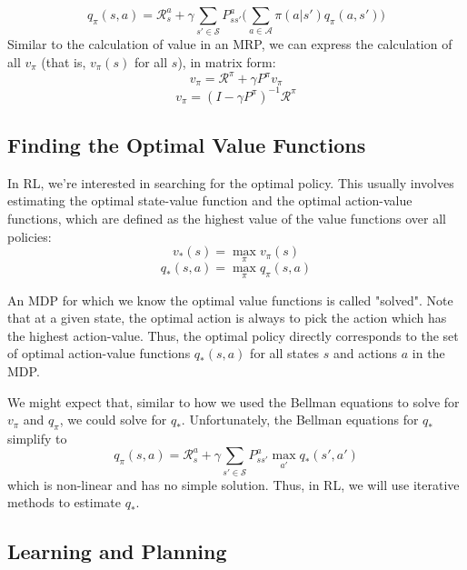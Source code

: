 \documentclass{article}
\begin{document}
\begin{equation}\label{eq:recursive_action_value_equation}
q_\pi(s, a) =  \mathcal{R}^a_s + \gamma\sum_{s'\in\mathcal{S}}P^a_{ss'}\bigg(\sum_{a\in\mathcal{A}} \pi(a|s')q_\pi(a, s')\bigg)
\end{equation}
Similar to the calculation of value in an MRP, we can express the calculation of all $v_\pi$ (that is, $v_\pi(s)$ for all $s$), in matrix form:
$$v_\pi = \mathcal{R}^\pi + \gamma P^\pi v_\pi$$
\begin{equation}\label{eq:bellman_simple_policy_value_equation}
v_\pi = (I - \gamma P^\pi)^{-1}\mathcal{R}^\pi
\end{equation}
\subsection{Finding the Optimal Value Functions}

In RL, we're interested in searching for the optimal policy. This usually involves estimating the optimal state-value function and the optimal action-value functions, which are defined as the highest value of the value functions over all policies:
\begin{equation}\label{eq:optimal_state_value_definition}
v_*(s) = \max_\pi v_\pi(s)
\end{equation}
\begin{equation}\label{eq:optimal_action_value_definition}
q_*(s, a) = \max_\pi q_\pi(s, a)
\end{equation}

An MDP for which we know the optimal value functions is called "solved". Note that at a given state, the optimal action is always to pick the action which has the highest action-value. Thus, the optimal policy directly corresponds to the set of optimal action-value functions $q_*(s, a)$ for all states $s$ and actions $a$ in the MDP.

We might expect that, similar to how we used the Bellman equations to solve for $v_\pi$ and $q_\pi$, we could solve for $q_*$. Unfortunately, the Bellman equations for $q_*$ simplify to
\begin{equation}\label{eq:bellman_optimal_action_value}
q_\pi(s, a) =  \mathcal{R}^a_s + \gamma\sum_{s'\in\mathcal{S}}P^a_{ss'}\max_{a'}q_*(s', a')
\end{equation}
which is non-linear and has no simple solution. Thus, in RL, we will use iterative methods to estimate $q_*$.

\subsection{Learning and Planning}
\end{document}
